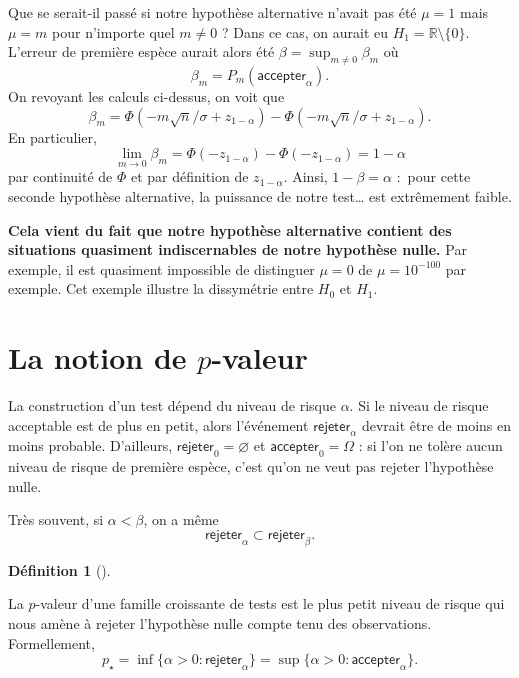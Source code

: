 \documentclass[
  10,
  letterpaper,
  DIV=11,
  numbers=noendperiod]{scrreport}
\theoremstyle{plain}
\theoremstyle{definition}
\theoremstyle{plain}
\theoremstyle{definition}
\newtheorem{definition}{Définition}[chapter]
\theoremstyle{definition}
\theoremstyle{plain}
\theoremstyle{remark}
\begin{document}
Que se serait-il passé si notre hypothèse alternative n'avait pas été
\(\mu=1\) mais \(\mu = m\) pour n'importe quel \(m\neq 0\) ? Dans ce
cas, on aurait eu \(H_1 = \mathbb{R}\setminus \{0\}\). L'erreur de
première espèce aurait alors été \(\beta = \sup_{m\neq 0}\beta_m\) où
\[ \beta_m = P_m(\mathsf{accepter}_\alpha).\] On revoyant les calculs
ci-dessus, on voit que
\[\beta_m = \Phi(-m\sqrt{n}/\sigma + z_{1-\alpha}) - \Phi(-m\sqrt{n}/\sigma + z_{1-\alpha}).\]
En particulier,
\[\lim_{m\to 0}\beta_m =\Phi(-z_{1-\alpha}) - \Phi(-z_{1-\alpha}) =  1-\alpha\]
par continuité de \(\Phi\) et par définition de \(z_{1-\alpha}\). Ainsi,
\(1-\beta = \alpha\) :~pour cette seconde hypothèse alternative, la
puissance de notre test\ldots{} est extrêmement faible.

\textbf{Cela vient du fait que notre hypothèse alternative contient des
situations quasiment indiscernables de notre hypothèse nulle.} Par
exemple, il est quasiment impossible de distinguer \(\mu = 0\) de
\(\mu = 10^{-100}\) par exemple. Cet exemple illustre la dissymétrie
entre \(H_0\) et \(H_1\).

\hypertarget{la-notion-de-p-valeur}{%
\section{\texorpdfstring{La notion de
\(p\)-valeur}{La notion de p-valeur}}\label{la-notion-de-p-valeur}}

La construction d'un test dépend du niveau de risque \(\alpha\). Si le
niveau de risque acceptable est de plus en petit, alors l'événement
\(\mathsf{rejeter}_\alpha\) devrait être de moins en moins probable.
D'ailleurs, \(\mathsf{rejeter}_0 = \varnothing\) et
\(\mathsf{accepter}_0 = \Omega\) : si l'on ne tolère aucun niveau de
risque de première espèce, c'est qu'on ne veut pas rejeter l'hypothèse
nulle.

Très souvent, si \(\alpha<\beta\), on a même
\[\mathsf{rejeter}_\alpha \subset \mathsf{rejeter}_\beta.  \]

\begin{definition}[]\protect\hypertarget{def-pval}{}\label{def-pval}

La \(p\)-valeur d'une famille croissante de tests est le plus petit
niveau de risque qui nous amène à rejeter l'hypothèse nulle compte tenu
des observations. Formellement,
\[ p_\star = \inf\{\alpha>0 : \mathsf{rejeter}_\alpha\} = \sup\{\alpha>0 : \mathsf{accepter}_\alpha\}.\]

\end{definition}
\end{document}
